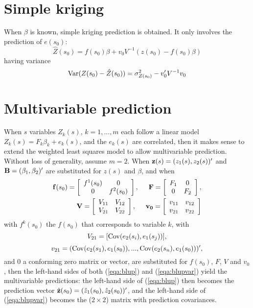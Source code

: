 \documentclass[a4paper,12pt]{book}
\newcommand{\Var}{{\rm Var}}   %
\newcommand{\Cov}{{\rm Cov}}   %
\newcommand{\hsp}{\hspace{.5cm}}
\begin{document}
\section*{Simple kriging}
\noindent
When $\beta$ is known, simple kriging prediction is obtained. It
only involves the prediction of $e(s_0)$:
$$
\hat Z (s_0 ) = f(s_0)\beta + v_0 V^{-1} (z(s_0 ) - f(s_0)\beta)
$$
having variance
$$
\Var (Z (s_0 ) - \hat Z (s_0 )) = \sigma^2_{Z (s_0)} - v_0 ' V^{-1} v_0
$$

\section*{Multivariable prediction}
\noindent
When $s$ variables $Z_k (s)$, $k=1,...,m$ each follow a linear model
$Z_k (s) = F_k \beta_k + e_k (s)$, and the $e_k (s)$ are correlated,
then it makes sense to extend the weighted least squares model to allow
multivariable prediction. Without loss of generality, assume $m=2$. When
${\bf z}(s)=(z_1 (s),z_2 (s))'$ and ${\bf B} = (\beta_1, \beta_2)'$ are
substituted for $z(s)$ and $\beta$, and when
\begin{eqnarray*}
{\bf f}(s_0) =
\left[
\begin{array}{cc}
f^1(s_0) & 0 \\
0 & f^2(s_0)
\end{array}
\right] ,\hsp
{\bf F} = 
\left[
\begin{array}{cc}
F_1 & 0 \\
0 & F_2 
\end{array}
\right], & \\
{\bf V} = 
\left[
\begin{array}{cc}
V_{11} & V_{12} \\
V_{21} & V_{22} 
\end{array}
\right],\hsp
{\bf v_0} = 
\left[
\begin{array}{cc}
v_{11} & v_{12} \\
v_{21} & v_{22} 
\end{array} 
\right]
\end{eqnarray*}
with $f^k(s_0)$ the $f(s_0)$ that corresponds
to variable $k$, with
$$V_{21} = [\Cov(e_2 (s_i),e_1 (s_j))],$$
$$v_{21} = (\Cov(e_2 (s_1 ),e_1 (s_0 )),...,
\Cov(e_2 (s_n ), e_1 (s_0 )))',$$ and 0 a conforming
zero matrix or vector, are substituted for $f(s_0)$, $F$, $V$
and $v_0$, then the left-hand sides of both (\ref{eqa:blup}) and
(\ref{eqa:blupvar}) yield the multivariable predictions: the left-hand
side of (\ref{eqa:blup}) then becomes the prediction vector $\hat {\bf z}
(s_0 ) = ( \hat{z}_1(s_0 ), \hat{z}_2 (s_0 ))'$, and the left-hand side
of (\ref{eqa:blupvar}) becomes the ($2 \times 2$) matrix with prediction
covariances.
\end{document}
